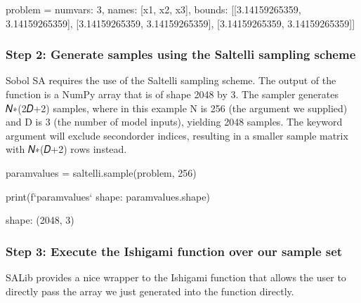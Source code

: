 \documentclass[letterpaper,10pt,english]{book}
\begin{document}
\begin{sphinxVerbatim}[commandchars=\\\{\}]
problem = \PYGZob{}
    \PYGZsq{}num\PYGZus{}vars\PYGZsq{}: 3,
    \PYGZsq{}names\PYGZsq{}: [\PYGZsq{}x1\PYGZsq{}, \PYGZsq{}x2\PYGZsq{}, \PYGZsq{}x3\PYGZsq{}],
    \PYGZsq{}bounds\PYGZsq{}: [[\PYGZhy{}3.14159265359, 3.14159265359],
               [\PYGZhy{}3.14159265359, 3.14159265359],
               [\PYGZhy{}3.14159265359, 3.14159265359]]
\PYGZcb{}
\end{sphinxVerbatim}


\subsubsection{Step 2: Generate samples using the Saltelli sampling scheme}
\label{\detokenize{A2_Jupyter_Notebooks:step-2-generate-samples-using-the-saltelli-sampling-scheme}}
\sphinxAtStartPar
Sobol SA requires the use of the Saltelli sampling scheme. The output of
the  function is a NumPy array that is of shape 2048
by 3. The sampler generates 𝑁∗(2𝐷+2) samples, where in this example N is
256 (the argument we supplied) and D is 3 (the number of model inputs),
yielding 2048 samples. The keyword argument 
will exclude second\sphinxhyphen{}order indices, resulting in a smaller sample matrix
with 𝑁∗(𝐷+2) rows instead.

\begin{sphinxVerbatim}[commandchars=\\\{\}]
param\PYGZus{}values = saltelli.sample(problem, 256)

print(f\PYGZdq{}`param\PYGZus{}values` shape:  \PYGZob{}param\PYGZus{}values.shape\PYGZcb{}\PYGZdq{})
\end{sphinxVerbatim}
\begin{sphinxalltt}
 shape:  (2048, 3)
\end{sphinxalltt}


\subsubsection{Step 3: Execute the Ishigami function over our sample set}
\label{\detokenize{A2_Jupyter_Notebooks:step-3-execute-the-ishigami-function-over-our-sample-set}}
\sphinxAtStartPar
SALib provides a nice wrapper to the Ishigami function that allows the
user to directly pass the  array we just generated into
the function directly.
\end{document}
